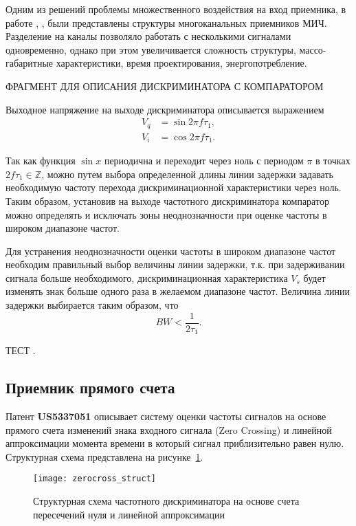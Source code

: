Одним из решений проблемы множественного воздействия на вход приемника, в работе \cite{Choi2014}, \cite{gruchalla_instantaneous_2006}, были представлены структуры многоканальных приемников МИЧ. Разделение на каналы позволяло работать с несколькими сигналами одновременно, однако при этом увеличивается сложность структуры, массо-габаритные характеристики, время проектирования, энергопотребление.

ФРАГМЕНТ ДЛЯ ОПИСАНИЯ ДИСКРИМИНАТОРА С КОМПАРАТОРОМ

Выходное напряжение на выходе дискриминатора описывается выражением
\begin{equation*}
	\begin{aligned}
		V_{q} &= \sin{2 \pi f \tau_{1}},\\
		V_{i} &= \cos{2 \pi f \tau_{1}}.
	\end{aligned}
\end{equation*}

Так как функция \(\sin{x}\) периодична и переходит через ноль с периодом \(\pi\) в точках \(2 f \tau_{1} \in \mathbb{Z} \), можно путем выбора определенной длины линии задержки задавать необходимую частоту перехода дискриминационной характеристики через ноль. Таким образом, установив на выходе частотного дискриминатора компаратор можно определять и исключать зоны неоднозначности при оценке частоты в широком диапазоне частот.

Для устранения неоднозначности оценки частоты в широком диапазоне частот необходим правильный выбор величины линии задержки, т.к. при задерживании сигнала больше необходимого, дискриминационная характеристика \(V_s\) будет изменять знак больше одного раза в желаемом диапазоне частот. Величина линии задержки выбирается таким образом, что
\begin{equation*}
	BW < \frac{1}{2 \tau_{1}}.
\end{equation*}

ТЕСТ \cite{patbib1,progbib1,patent2,patent3h,patent2h}.

\subsection{Приемник прямого счета}
Патент \textbf{US5337051} описывает систему оценки частоты сигналов на основе прямого счета изменений знака входного сигнала (Zero Crossing) и линейной аппроксимации момента времени в который сигнал приблизительно равен нулю. Структурная схема представлена на рисунке~\ref{ct:zerocross_struct}.
\begin{figure}[ht]
	\centering
	\texttt{[image: zerocross\_struct]}
	
	\caption{Структурная схема частотного дискриминатора на основе счета пересечений нуля и линейной аппроксимации}
	\label{ct:zerocross_struct}
\end{figure}

